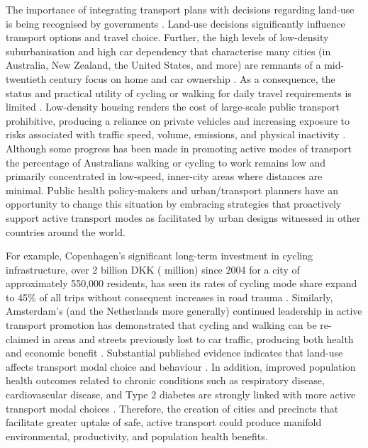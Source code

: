 \documentclass[10pt,letterpaper]{article}
\begin{document}
The importance of integrating transport plans with decisions regarding land-use is being recognised by governments \cite{ATAP2016,SAustralia2015}. Land-use decisions significantly influence transport options and travel choice. Further, the high levels of low-density suburbanisation and high car dependency that characterise many cities (in Australia, New Zealand, the United States, and more) are remnants of a mid-twentieth century focus on home and car ownership \cite{Currie2007,Dodson2008}. As a consequence, the status and practical utility of cycling or walking for daily travel requirements is limited \cite{Heesch2014,Daley2011}. Low-density housing renders the cost of large-scale public transport prohibitive, producing a reliance on private vehicles and increasing exposure to risks associated with traffic speed, volume, emissions, and physical inactivity  \cite{Cepeda2016,MingWen2008,Norman2006}. Although some progress has been made in promoting active modes of transport the percentage of Australians walking or cycling to work remains low and primarily concentrated in low-speed, inner-city areas where distances are minimal. Public health policy-makers and urban/transport planners have an opportunity to change this situation by embracing strategies that proactively support active transport modes as facilitated by urban designs witnessed in other countries around the world.

For example, Copenhagen's significant long-term investment in cycling infrastructure, over 2 billion DKK ( million) since 2004 \cite{Copenhagen2017b} for a city of approximately 550,000 residents, has seen its rates of cycling mode share expand to 45\% of all trips without consequent increases in road trauma \cite{Kaplan2014}. Similarly, Amsterdam's (and the Netherlands more generally) continued leadership in active transport promotion has demonstrated that cycling and walking can be re-claimed in areas and streets previously lost to car traffic, producing both health and economic benefit \cite{Andersen2000}. Substantial published evidence indicates that land-use affects transport modal choice and behaviour  \cite{Giles-corti2016,Kleinert2016,Goenka2016}. In addition, improved population health outcomes related to chronic conditions such as respiratory disease, cardiovascular disease, and Type 2 diabetes are strongly linked with more active transport modal choices  \cite{Zapata-Diomedi2017}. Therefore, the creation of cities and precincts that facilitate greater uptake of safe, active transport could produce manifold environmental, productivity, and population health benefits. 
\end{document}
